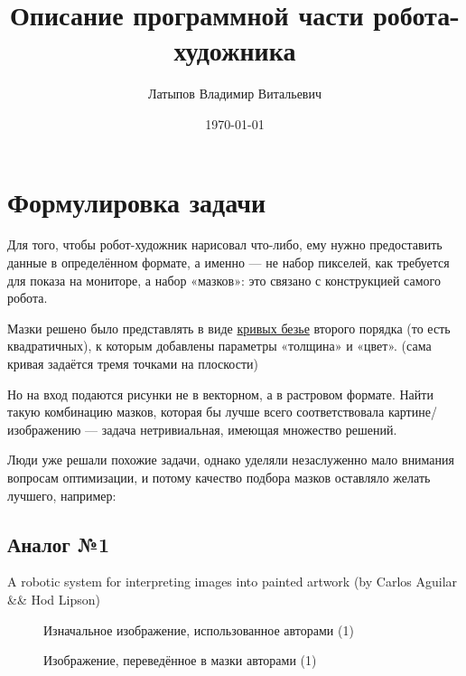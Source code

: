 \documentclass[11pt]{article}
\title{Описание программной части робота-художника}
\author{Латыпов Владимир Витальевич}
\date{\today}
\begin{document}
    \maketitle
    \newpage
    \tableofcontents
    \newpage

    \section{Формулировка задачи}\label{sec:formulating_task}

    Для того, чтобы робот-художник нарисовал что-либо, ему нужно предоставить данные в определённом формате, а именно — не набор пикселей,
    как требуется для показа на мониторе, а набор «мазков»: это связано с конструкцией самого робота.

    Мазки решено было представлять в виде \href{https://en.wikipedia.org/wiki/B\%C3\%A9zier_curve}{кривых безье} второго порядка (то есть квадратичных), к которым добавлены параметры «толщина» и «цвет».
    (сама кривая задаётся тремя точками на плоскости)

    Но на вход подаются рисунки не в векторном, а в растровом формате.
    Найти такую комбинацию мазков, которая бы лучше всего соответствовала картине/изображению — задача нетривиальная, имеющая множество решений.

    Люди уже решали похожие задачи, однако уделяли незаслуженно мало внимания вопросам оптимизации,
    и потому качество подбора мазков оставляло желать лучшего, например:

    \subsection{Аналог №1}
    A robotic system for interpreting images into painted artwork (by Carlos Aguilar \&\& Hod Lipson)

    \begin{figure}[h!]
        \centering
        \caption{Изначальное изображение, использованное авторами (1)}
        \label{fig:initial_hod}
    \end{figure}

    \begin{figure}[h!]
        \centering
        \caption{Изображение, переведённое в мазки авторами (1)}
        \label{fig:result_hod}
    \end{figure}
\end{document}

